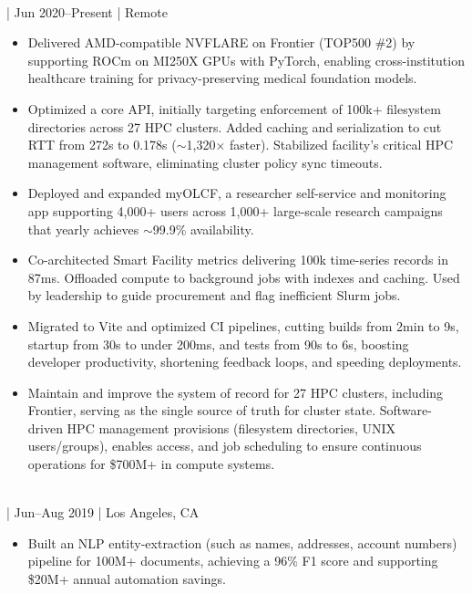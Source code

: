 \documentclass[11pt,a4paper]{article}
\newcommand{\regbullet}[1]{
    \vspace{-2pt}%
    \item {\fontsize{10}{12}\selectfont #1}
}
\begin{document}
\\
  |  {\fontsize{10}{12}\selectfont Jun 2020--Present}  |  {\fontsize{10}{12}\selectfont Remote}
\begin{itemize}[leftmargin=18pt,itemsep=1pt,topsep=0pt]
\regbullet{Delivered AMD-compatible NVFLARE on Frontier (TOP500 \#2) by supporting ROCm on MI250X GPUs with PyTorch, enabling cross-institution healthcare training for privacy-preserving medical foundation models.}

\regbullet{Optimized a core API, initially targeting enforcement of 100k+ filesystem directories across 27 HPC clusters. Added caching and serialization to cut RTT from 272s to 0.178s ($\sim$1,320$\times$ faster). Stabilized facility's critical HPC management software, eliminating cluster policy sync timeouts.}

\regbullet{Deployed and expanded myOLCF, a researcher self-service and monitoring app supporting 4,000+ users across 1,000+ large-scale research campaigns that yearly achieves $\sim$99.9\% availability.}

\regbullet{Co-architected Smart Facility metrics delivering 100k time-series records in 87ms. Offloaded compute to background jobs with indexes and caching. Used by leadership to guide procurement and flag inefficient Slurm jobs.}

\regbullet{Migrated to Vite and optimized CI pipelines, cutting builds from 2min to 9s, startup from 30s to under 200ms, and tests from 90s to 6s, boosting developer productivity, shortening feedback loops, and speeding deployments.}

\regbullet{Maintain and improve the system of record for 27 HPC clusters, including Frontier, serving as the single source of truth for cluster state. Software-driven HPC management provisions (filesystem directories, UNIX users/groups), enables access, and job scheduling to ensure continuous operations for \$700M+ in compute systems.}

\end{itemize}

\vspace{2pt}
\\
  |  {\fontsize{10}{12}\selectfont Jun--Aug 2019}  |  {\fontsize{10}{12}\selectfont Los Angeles, CA}
\begin{itemize}[leftmargin=18pt,itemsep=1pt,topsep=0pt]
\regbullet{Built an NLP entity-extraction (such as names, addresses, account numbers) pipeline for 100M+ documents, achieving a 96\% F1 score and supporting \$20M+ annual automation savings.}
\end{itemize}
\end{document}
